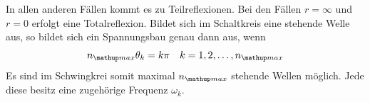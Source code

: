 In allen anderen Fällen kommt es zu Teilreflexionen.
Bei den Fällen $r=\infty$ und $r=0$ erfolgt eine Totalreflexion.
Bildet sich im Schaltkreis eine stehende Welle aus, so bildet sich ein Spannungsbau genau dann aus, wenn
\begin{equation}
\label{eq:spannungsbauch}
n\ua{max}\theta_k=k\pi \quad k=1,2,\dots,n\ua{max}
\end{equation}
Es sind im Schwingkrei somit maximal $n\ua{max}$ stehende Wellen möglich.
Jede diese besitz eine zugehörige Frequenz $\omega_k$.
